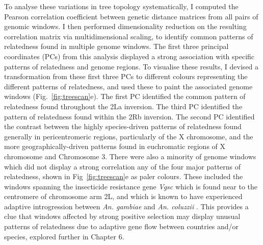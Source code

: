 \documentclass[a4paper,11pt,abstracton,hidelinks]{scrartcl}
\begin{document}
To analyse these variations in tree topology systematically, I computed the Pearson correlation coefficient between genetic distance matrices from all pairs of genomic windows.
%
I then performed dimensionality reduction on the resulting correlation matrix via multidimensional scaling, to identify common patterns of relatedness found in multiple genome windows.
%
The first three principal coordinates (PCs) from this analysis displayed a strong association with specific patterns of relatedness and genome regions.
%
To visualise these results, I devised a transformation from these first three PCs to different colours representing the different patterns of relatedness, and used these to paint the associated genome windows (Fig.~\ref{fig:treescan}e).
%
The first PC identified the common pattern of relatedness found throughout the 2La inversion.
%
The third PC identified the pattern of relatedness found within the 2Rb inversion.
%
The second PC identified the contrast between the highly species-driven patterns of relatedness found generally in pericentromeric regions, particularly of the X chromosome, and the more geographically-driven patterns found in euchromatic regions of X chromosome and Chromosome 3.
%
There were also a minority of genome windows which did not display a strong correlation any of the four major patterns of relatedness, shown in Fig~\ref{fig:treescan}e as paler colours.
%
These included the windows spanning the insecticide resistance gene \textit{Vgsc} which is found near to the centromere of chromosome arm 2L, and which is known to have experienced adaptive introgression between \textit{An. gambiae} and \textit{An. coluzzii} \parencite{Clarkson2014,Norris2015}.
%
This provides a clue that windows affected by strong positive selection may display unusual patterns of relatedness due to adaptive gene flow between countries and/or species, explored further in Chapter 6.
\end{document}
